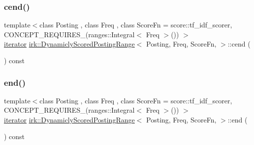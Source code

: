 \subsubsection{\texorpdfstring{cend()}{cend()}}
{\footnotesize\ttfamily template$<$class Posting , class Freq , class Score\+Fn  = score\+::tf\+\_\+idf\+\_\+scorer, C\+O\+N\+C\+E\+P\+T\+\_\+\+R\+E\+Q\+U\+I\+R\+E\+S\+\_\+(ranges\+::\+Integral$<$ Freq $>$()) $>$ \\
\mbox{\hyperlink{classirk_1_1DynamiclyScoredPostingRange_1_1iterator}{iterator}} \mbox{\hyperlink{classirk_1_1DynamiclyScoredPostingRange}{irk\+::\+Dynamicly\+Scored\+Posting\+Range}}$<$ Posting, Freq, Score\+Fn, $>$\+::cend (\begin{DoxyParamCaption}{ }\end{DoxyParamCaption}) const\hspace{0.3cm}{\ttfamily [inline]}}

\mbox{\label{classirk_1_1DynamiclyScoredPostingRange_ab06998cf9db3dab95fa521815c0c1e1a}} 
\subsubsection{\texorpdfstring{end()}{end()}}
{\footnotesize\ttfamily template$<$class Posting , class Freq , class Score\+Fn  = score\+::tf\+\_\+idf\+\_\+scorer, C\+O\+N\+C\+E\+P\+T\+\_\+\+R\+E\+Q\+U\+I\+R\+E\+S\+\_\+(ranges\+::\+Integral$<$ Freq $>$()) $>$ \\
\mbox{\hyperlink{classirk_1_1DynamiclyScoredPostingRange_1_1iterator}{iterator}} \mbox{\hyperlink{classirk_1_1DynamiclyScoredPostingRange}{irk\+::\+Dynamicly\+Scored\+Posting\+Range}}$<$ Posting, Freq, Score\+Fn, $>$\+::end (\begin{DoxyParamCaption}{ }\end{DoxyParamCaption}) const\hspace{0.3cm}{\ttfamily [inline]}}

\mbox{\label{classirk_1_1DynamiclyScoredPostingRange_abbe4a0bacd2619a9ad5c00b0e6851a97}} 

